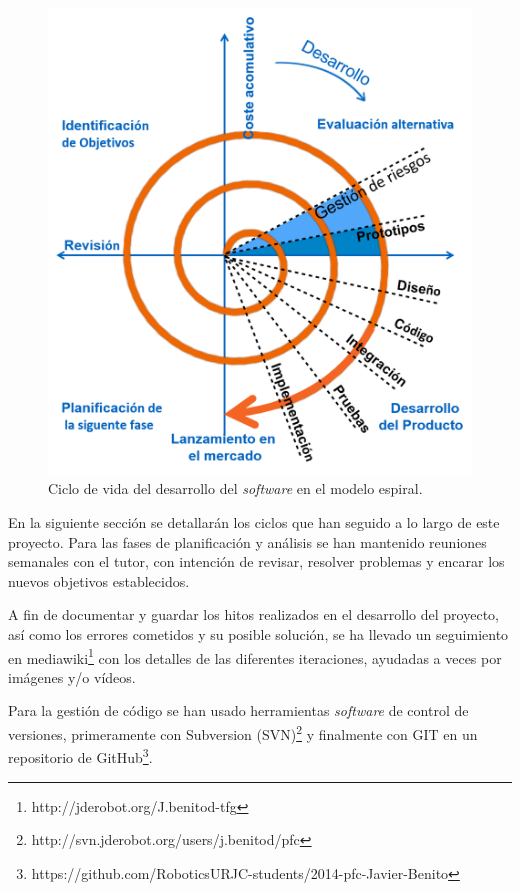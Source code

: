 \begin{figure}[th]
\centering
\includegraphics[scale=0.62]{Figures/spiral.png}
\decoRule
\caption[Spiral]{Ciclo de vida del desarrollo del \textit{software} en el modelo espiral.}
\label{fig:spiral}
\end{figure}

En la siguiente sección se detallarán los ciclos que han seguido a lo largo de este proyecto. Para las fases de planificación y análisis se han mantenido reuniones semanales con el tutor, con intención de revisar, resolver problemas y encarar los nuevos objetivos establecidos.

A fin de documentar y guardar los hitos realizados en el desarrollo del proyecto, así como los errores cometidos y su posible solución, se ha llevado un seguimiento en mediawiki\footnote{http://jderobot.org/J.benitod-tfg} con los detalles de las diferentes iteraciones, ayudadas a veces por imágenes y/o vídeos.

Para la gestión de código se han usado herramientas \textit{software} de control de versiones, primeramente con Subversion (SVN)\footnote{http://svn.jderobot.org/users/j.benitod/pfc} y finalmente con GIT en un repositorio de GitHub\footnote{https://github.com/RoboticsURJC-students/2014-pfc-Javier-Benito}.

